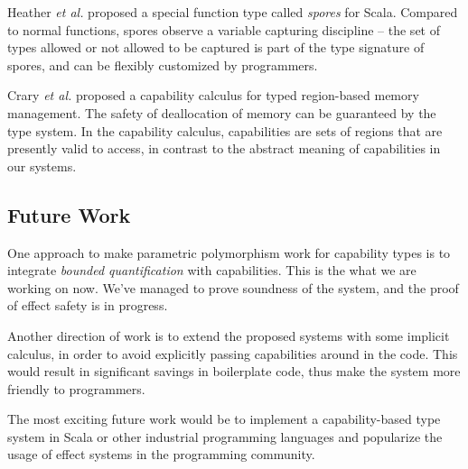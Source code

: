 Heather \emph{et al.} proposed a special function type called
\emph{spores} for Scala\cite{miller2014spores}. Compared to normal
functions, spores observe a variable capturing discipline -- the set
of types allowed or not allowed to be captured is part of the type
signature of spores, and can be flexibly customized by programmers.

Crary \emph{et al.} proposed a capability calculus for typed
region-based memory management\cite{crary1999typed}. The safety of
deallocation of memory can be guaranteed by the type system. In the
capability calculus, capabilities are sets of regions that are
presently valid to access, in contrast to the abstract meaning of
capabilities in our systems.

\subsection{Future Work}

One approach to make parametric polymorphism work for capability types
is to integrate \emph{bounded quantification} with capabilities. This
is the what we are working on now. We've managed to prove soundness of
the system, and the proof of effect safety is in progress.

Another direction of work is to extend the proposed systems with some
implicit calculus, in order to avoid explicitly passing capabilities
around in the code. This would result in significant savings in
boilerplate code, thus make the system more friendly to programmers.

The most exciting future work would be to implement a capability-based
type system in Scala or other industrial programming languages and
popularize the usage of effect systems in the programming community.
